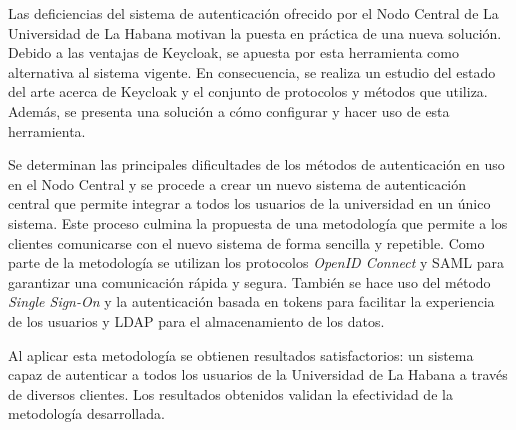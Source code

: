 \begin{resumen}
	Las deficiencias del sistema de autenticación ofrecido por el Nodo Central de La Universidad de La Habana motivan la puesta en práctica de una nueva solución. Debido a las ventajas de Keycloak, se apuesta por esta herramienta como alternativa al sistema vigente. En consecuencia, se realiza un estudio del estado del arte acerca de Keycloak y el conjunto de protocolos y métodos que utiliza. Además, se presenta una solución a cómo configurar y hacer uso de esta herramienta.
	
	Se determinan las principales dificultades de los métodos de autenticación en uso en el Nodo Central y se procede a crear un nuevo sistema de autenticación central que permite integrar a todos los usuarios de la universidad en un único sistema. Este proceso culmina la propuesta de una metodología que permite a los clientes comunicarse con el nuevo sistema de forma sencilla y repetible. Como parte de la metodología se utilizan los protocolos \textit{OpenID Connect} y SAML para garantizar una comunicación rápida y segura. También se hace uso del método \textit{Single Sign-On} y la autenticación basada en tokens para facilitar la experiencia de los usuarios y LDAP para el almacenamiento de los datos.
	
	Al aplicar esta metodología se obtienen resultados satisfactorios: un sistema capaz de autenticar a todos los usuarios de la Universidad de La Habana a través de diversos clientes. Los resultados obtenidos validan la efectividad de la metodología desarrollada.


\end{resumen}

